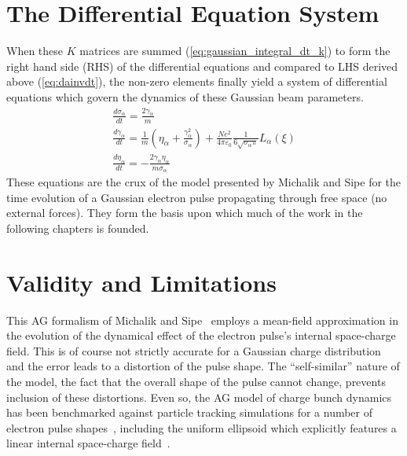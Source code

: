 \section{The Differential Equation System}

When these $K$ matrices are summed (\ref{eq:gaussian_integral_dt_k}) to form the right hand side (RHS) of the differential equations and compared to LHS derived above (\ref{eq:dainvdt}), the non-zero elements finally yield a system of differential equations which govern the dynamics of these Gaussian beam parameters.
\begin{subequations} \label{eq:ag_original}
\begin{gather}
  \frac{d\sigma_{\alpha}}{dt} = \frac{2\gamma_{\alpha}}{m} \\
  \frac{d\gamma_{\alpha}}{dt} = \frac{1}{m} \left(\eta_{\alpha} + \frac{\gamma_{\alpha}^2}{\sigma_{\alpha}} \right) 
    + \frac{N e^2}{4\pi\varepsilon_0} \frac{1}{6 \sqrt{\sigma_{\alpha}\pi}} L_{\alpha}(\xi)\\
  \frac{d\eta_{\alpha}}{dt} = - \frac{2 \gamma_{\alpha} \eta_{\alpha}}{m \sigma_{\alpha}}
\end{gather}
\end{subequations}
These equations are the crux of the model presented by Michalik and Sipe for the time evolution of a Gaussian electron pulse propagating through free space (no external forces).
They form the basis upon which much of the work in the following chapters is founded.

\section{Validity and Limitations}

This AG formalism of Michalik and Sipe~\cite{michalik_analytic_2006} employs a mean-field approximation in the evolution of the dynamical effect of the electron pulse's internal space-charge field.
This is of course not strictly accurate for a Gaussian charge distribution and the error leads to a distortion of the pulse shape.
The ``self-similar'' nature of the model, the fact that the overall shape of the pulse cannot change, prevents inclusion of these distortions.
Even so, the AG model of charge bunch dynamics has been benchmarked against particle tracking simulations for a number of electron pulse shapes~\cite{michalik_analytic_2006,michalik_evolution_2009}, including the uniform ellipsoid which explicitly features a linear internal space-charge field~\cite{luiten_how_2004}.

